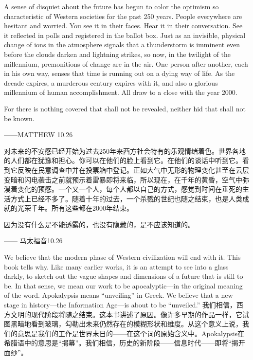 \begin{paracol}{2}[]
A sense of disquiet about the future has begun to color the optimism so characteristic of Western societies for the past 250 years. People everywhere are hesitant and worried. You see it in their faces. Hear it in their conversation. See it reflected in polls and registered in the ballot box. Just as an invisible, physical change of ions in the atmosphere signals that a thunderstorm is imminent even before the clouds darken and lightning strikes, so now, in the twilight of the millennium, premonitions of change are in the air. One person after another, each in his own way, senses that time is running out on a dying way of life. As the decade expires, a murderous century expires with it, and also a glorious millennium of human accomplishment. All draw to a close with the year 2000.
\begin{tcolorbox}
For there is nothing covered that shall not be revealed, neither hid that shall not be known. \\ 
\begin{flushright}
——MATTHEW 10.26
\end{flushright}
\end{tcolorbox}
\switchcolumn
对未来的不安感已经开始为过去250年来西方社会特有的乐观情绪着色。世界各地的人们都在犹豫和担心。你可以在他们的脸上看到它。在他们的谈话中听到它。看到它反映在民意调查中并在投票箱中登记。正如大气中无形的物理变化甚至在云层变暗和闪电袭击之前就预示着雷暴即将来临，所以现在，在千年的黄昏，空气中弥漫着变化的预感。一个又一个人，每个人都以自己的方式，感觉到时间在垂死的生活方式上已经不多了。随着十年的过去，一个杀戮的世纪也随之结束，也是人类成就的光荣千年。所有这些都在2000年结束。
\begin{tcolorbox}
因为没有什么是不能透露的，也没有隐藏的，是不应该知道的。
\begin{flushright}
—— 马太福音10.26
\end{flushright}
\end{tcolorbox}
\end{paracol}


\begin{paracol}{2}[]
We believe that the modern phase of Western civilization will end with it. This book tells why. Like many earlier works, it is an attempt to see into a glass darkly, to sketch out the vague shapes and dimensions of a future that is still to be. In that sense, we mean our work to be apocalyptic—in the original meaning of the word. Apokalypsis means “unveiling” in Greek. We believe that a new stage in history—the Information Age—is about to be “unveiled.”
\switchcolumn
我们相信，西方文明的现代阶段将随之结束。这本书讲述了原因。像许多早期的作品一样，它试图黑暗地看到玻璃，勾勒出未来仍然存在的模糊形状和维度。从这个意义上说，我们的意思是我们的工作是世界末日的——在这个词的原始含义中。Apokalypsis在希腊语中的意思是“揭幕”。我们相信，历史的新阶段——信息时代——即将“揭开面纱”。
\end{paracol}

